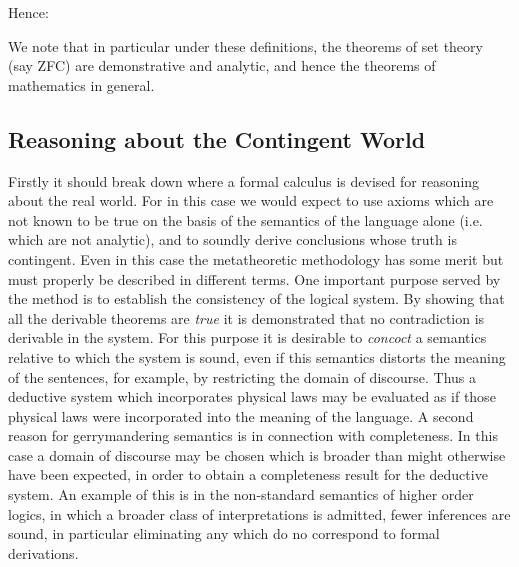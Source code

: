 \documentclass{rbjk}
\begin{document}
\begin{article}
Hence:

We note that in particular under these definitions, the theorems of set theory (say ZFC) are demonstrative and analytic, and hence the theorems of mathematics in general.

\subsection{Reasoning about the Contingent World}

Firstly it should break down where a formal calculus is devised for reasoning about the real world.
For in this case we would expect to use axioms which are not known to be true on the basis of the semantics of the language alone (i.e. which are not analytic), and to soundly derive conclusions whose truth is contingent.
Even in this case the metatheoretic methodology has some merit but must properly be described in different terms.
One important purpose served by the method is to establish the consistency of the logical system.
By showing that all the derivable theorems are {\it true} it is demonstrated that no contradiction is derivable in the system.
For this purpose it is desirable to {\it concoct} a semantics relative to which the system is sound, even if this semantics distorts the meaning of the sentences, for example, by restricting the domain of discourse.
Thus a deductive system which incorporates physical laws may be evaluated as if those physical laws were incorporated into the meaning of the language.
A second reason for gerrymandering semantics is in connection with completeness.
In this case a domain of discourse may be chosen which is broader than might otherwise have been expected, in order to obtain a completeness result for the deductive system.
An example of this is in the non-standard semantics of higher order logics, in which a broader class of interpretations is admitted, fewer inferences are sound, in particular eliminating any which do no correspond to formal derivations.


\end{article}
\end{document}
